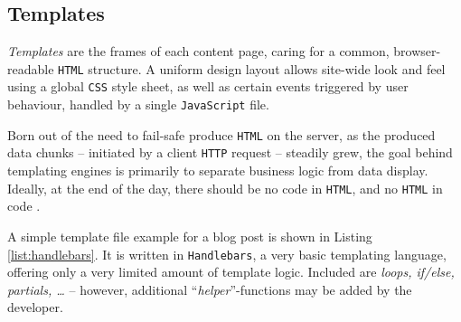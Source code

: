 \subsection{Templates}
\label{sec:buildpipelines-templates}

\emph{Templates} are the frames of each content page, caring for a common, browser-readable \texttt{HTML} structure. A uniform design layout allows site-wide look and feel using a global \texttt{CSS} style sheet, as well as certain events triggered by user behaviour, handled by a single \texttt{JavaScript} file.

Born out of the need to fail-safe produce \texttt{HTML} on the server, as the produced data chunks -- initiated by a client \texttt{HTTP} request -- steadily grew, the goal behind templating engines is primarily to separate business logic from data display. Ideally, at the end of the day, there should be no code in \texttt{HTML}, and no \texttt{HTML} in code \cite[225]{Parr2004templates}.



A simple template file example for a blog post is shown in Listing \ref{list:handlebars}. It is written in \texttt{Handlebars}, a very basic templating language, offering only a very limited amount of template logic. Included are \emph{loops, if/else, partials, \ldots} -- however, additional ``\emph{helper}''-functions may be added by the developer.
